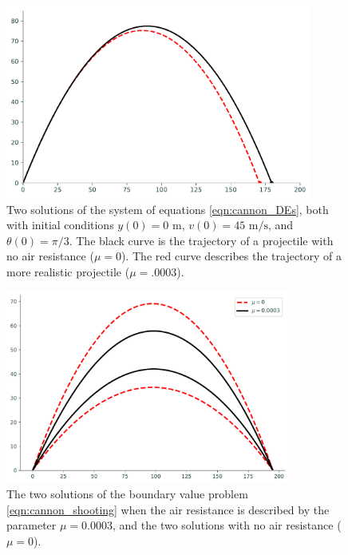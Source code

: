 \begin{figure}[H]
\includegraphics[height=2.5in]{figures/cannon_comparison.pdf}
\caption{Two solutions of the system of equations \eqref{eqn:cannon_DEs}, both with initial conditions  $y(0) = 0 \text{ m}$, $ v(0) = 45 \text{ m/s}$, and $\theta(0)=\pi/3$.
The black curve is the trajectory of a projectile with no air resistance ($\mu = 0$).
The red curve describes the trajectory of a more realistic projectile ($\mu = .0003$).}
\label{fig:shooting_cannon_comparison1}
\end{figure}

\begin{figure}[H]
\includegraphics[height=2.5in]{figures/problem3.pdf}
\caption{The two solutions of the boundary value problem \eqref{eqn:cannon_shooting} when the air resistance is described by the parameter $\mu = 0.0003$,
and the two solutions with no air resistance ($\mu = 0$).}
\label{fig:shooting_cannon_comparison2}
\end{figure}
